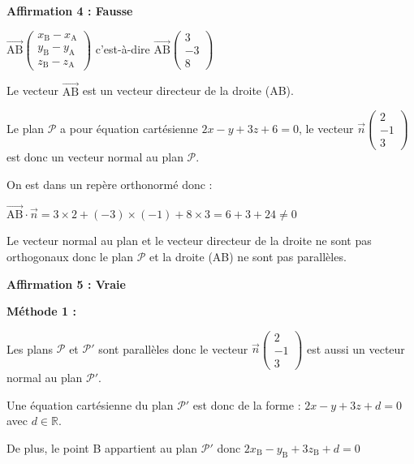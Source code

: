 \documentclass[10pt]{article}
\providecommand{\R}{\mathbb{R}}
\providecommand{\vect}[1]{\overrightarrow{#1}}
\begin{document}
\medskip








\textbf{Affirmation 4 : Fausse}

\smallskip

$\vect{\mathrm{AB}}\begin{pmatrix}x_\mathrm{B} -x_\mathrm{A} \\ y_\mathrm{B}-y_\mathrm{A}\\z_\mathrm{B}-z_\mathrm{A}\end{pmatrix}$ c'est-à-dire $\vect{\mathrm{AB}}\begin{pmatrix}3 \\ -3\\8\end{pmatrix}$

Le vecteur $\vect{\mathrm{AB}}$ est un vecteur directeur de la droite (AB).

 Le plan $\mathcal{P}$ a pour équation cartésienne $2x - y + 3z + 6 = 0$, le vecteur $\vect{n}\begin{pmatrix}2\\-1\\3\end{pmatrix}$ est donc un vecteur normal au plan $\mathcal{P}$.

On est dans un repère orthonormé donc :

$\vect{\mathrm{AB}} \cdot \vect{n}= 3 \times 2 + (-3) \times (-1) + 8 \times 3 = 6+3+24 \neq 0$

Le vecteur normal au plan et le vecteur directeur de la droite ne sont pas orthogonaux donc le plan $\mathcal{P}$ et la droite (AB) ne sont pas parallèles.

\textbf{Affirmation 5 : Vraie}

\smallskip

\textbf{Méthode 1 :}

Les plans $\mathcal{P}$ et $\mathcal{P}'$ sont parallèles donc le vecteur $\vect{n}\begin{pmatrix}2\\-1\\3\end{pmatrix}$ est aussi un vecteur normal au plan $\mathcal{P}'$.

Une équation cartésienne du plan $\mathcal{P}'$ est donc de la forme : $2x - y +3z + d = 0$ avec $d\in \R$.

De plus, le point B appartient au plan $\mathcal{P}'$ donc $2x_{\mathrm{B}} - y_{\mathrm{B}} +3z_{\mathrm{B}} + d= 0$
\end{document}
